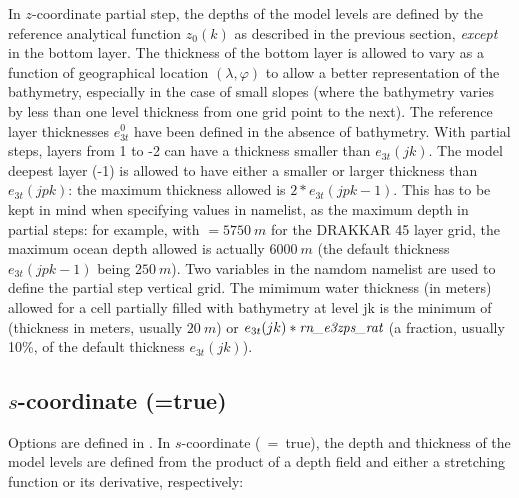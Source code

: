 \documentclass[NEMO_book]{subfiles}
\begin{document}
In $z$-coordinate partial step, the depths of the model levels are defined by the 
reference analytical function $z_0 (k)$ as described in the previous 
section, \emph{except} in the bottom layer. The thickness of the bottom layer is 
allowed to vary as a function of geographical location $(\lambda,\varphi)$ to allow a 
better representation of the bathymetry, especially in the case of small 
slopes (where the bathymetry varies by less than one level thickness from 
one grid point to the next). The reference layer thicknesses $e_{3t}^0$ have been 
defined in the absence of bathymetry. With partial steps, layers from 1 to 
-2 can have a thickness smaller than $e_{3t}(jk)$. The model deepest layer (-1) 
is allowed to have either a smaller or larger thickness than $e_{3t}(jpk)$: the 
maximum thickness allowed is $2*e_{3t}(jpk-1)$. This has to be kept in mind when 
specifying values in  namelist, as the maximum depth  
in partial steps: for example, with 
$=5750~m$ for the DRAKKAR 45 layer grid, the maximum ocean depth 
allowed is actually $6000~m$ (the default thickness $e_{3t}(jpk-1)$ being $250~m$). 
Two variables in the namdom namelist are used to define the partial step 
vertical grid. The mimimum water thickness (in meters) allowed for a cell 
partially filled with bathymetry at level jk is the minimum of  
(thickness in meters, usually $20~m$) or $e_{3t}(jk)*\np{rn\_e3zps\_rat}$ (a fraction, 
usually 10\%, of the default thickness $e_{3t}(jk)$).


\subsection   [$s$-coordinate (\np{ln\_sco})]
		     {$s$-coordinate (=true)}
\label{DOM_sco}
Options are defined in .
In $s$-coordinate (~=~true), the depth and thickness of the model 
levels are defined from the product of a depth field and either a stretching 
function or its derivative, respectively:
\end{document}
